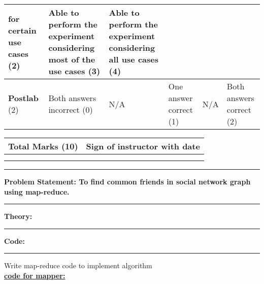 \documentclass[11pt,article]{memoir}
\begin{document}
\begin{flushleft}
\begin{tabular}{|p{2cm}|p{2cm}|p{2cm}|p{2cm}|p{2cm}|p{2cm}|}
                              for certain use
                              cases (2) & Able to
                              perform the
                              experiment
                              considering
                              most of the
                              use cases (3)
                              & Able to
                              perform the
                              experiment
                              considering
                              all use cases
                              (4) \\ 
                             \hline \textbf{Postlab} (2) & Both answers incorrect (0) & N/A & One answer correct  (1) & N/A & Both answers correct (2) \\ 
                             \hline 
                             \end{tabular}
        \begin{table}[h!]
        \centering
        \begin{tabular}{|c|c|}
                \hline \textbf{Total Marks (10)} & \textbf{Sign of instructor with date} \\ 
                \hline  &  \\ & \\
                \hline 
                \end{tabular} 
        \end{table}
        
    \pagebreak


\maketitle

\hrule \vspace{0.2cm}
\textbf{Problem Statement: To find common friends in social network graph using map-reduce. }\hrule\vspace{0.2cm}
\textbf{Theory:}\hrule\vspace{0.2cm}
\afterpage{\newpage~\newpage}\newpage
\textbf{Code:}\hrule
\vspace{0.5cm}
Write map-reduce code to implement algorithm\\
\textbf{\underline{code for mapper:}}

\begin{lstlisting}[language=java]


\end{lstlisting}
\end{flushleft}
\end{document}
